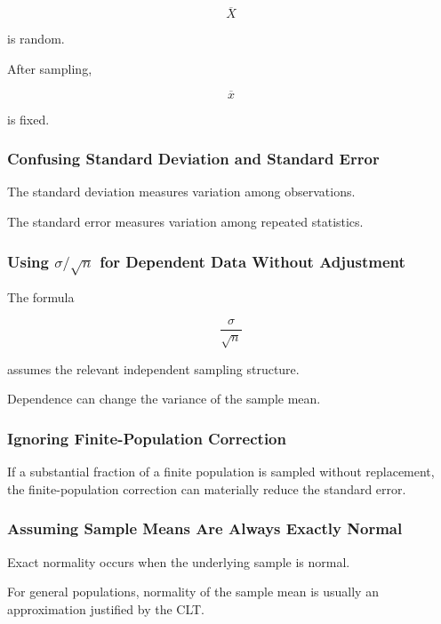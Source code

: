 \[
\overline{X}
\]

is random.

After sampling,

\[
\overline{x}
\]

is fixed.

\subsubsection{Confusing Standard Deviation and Standard Error}

The standard deviation measures variation among observations.

The standard error measures variation among repeated statistics.

\subsubsection{Using \(\sigma/\sqrt{n}\) for Dependent Data Without Adjustment}

The formula

\[
\frac{\sigma}{\sqrt{n}}
\]

assumes the relevant independent sampling structure.

Dependence can change the variance of the sample mean.

\subsubsection{Ignoring Finite-Population Correction}

If a substantial fraction of a finite population is sampled without
replacement, the finite-population correction can materially reduce the
standard error.

\subsubsection{Assuming Sample Means Are Always Exactly Normal}

Exact normality occurs when the underlying sample is normal.

For general populations, normality of the sample mean is usually an
approximation justified by the CLT.

